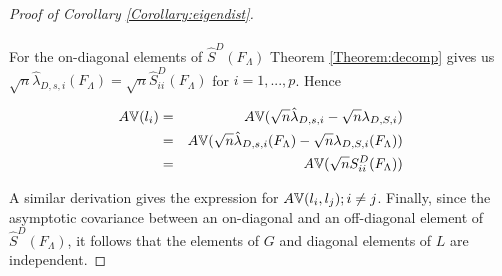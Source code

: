 \begin{proof}[Proof of Corollary \ref{Corollary:eigendist}]
\paragraph{}For the on-diagonal elements of $\hat S^D(F_\Lambda)$ Theorem \ref{Theorem:decomp} gives us $ \sqrt n \hat\lambda_{D,s,i} (F_\Lambda) = \sqrt n \hat S^D_{ii}(F_\Lambda)$ for $i = 1,...,p$. Hence

\begin{eqnarray*}
A{\mathbb{V}}(l_i) &=& A{\mathbb{V}}(\sqrt n \hat\lambda_{D,s,i} - \sqrt n \lambda_{D,S,i})\\
&=& A{\mathbb{V}}(\sqrt n \hat\lambda_{D,s,i} (F_\Lambda) - \sqrt n \lambda_{D,S,i}(F_\Lambda))\\
&=& A{\mathbb{V}}(\sqrt n S^D_{ii}(F_\Lambda))
\end{eqnarray*}

A similar derivation gives the expression for $A{\mathbb{V}}(l_i,l_j); i \neq j$. Finally, since the asymptotic covariance between an on-diagonal and an off-diagonal element of $\hat S^D(F_\Lambda)$, it follows that the elements of $G$ and diagonal elements of $L$ are independent.
\end{proof}

